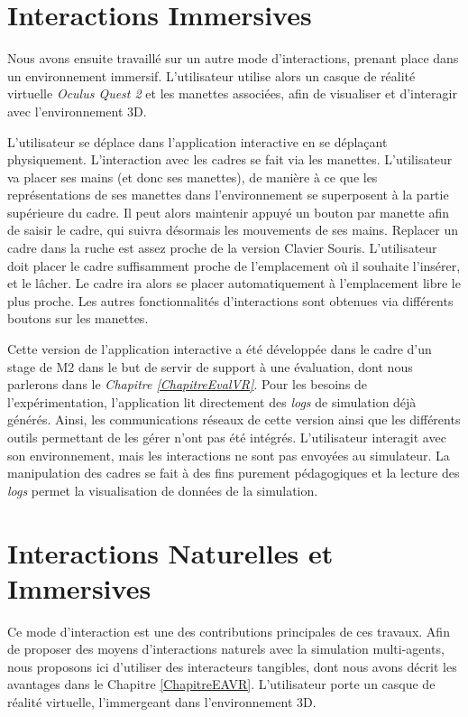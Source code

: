 		
		
	\section{Interactions Immersives}
	\label{immersionSansTangibles}
		Nous avons ensuite travaillé sur un autre mode d'interactions, prenant place dans un environnement immersif. L'utilisateur utilise alors un casque de réalité virtuelle \textit{Oculus Quest 2} et les manettes associées, afin de visualiser et d'interagir avec l'environnement 3D.
		
		 L'utilisateur se déplace dans l'application interactive en se déplaçant physiquement. L'interaction avec les cadres se fait via les manettes. L'utilisateur va placer ses mains (et donc ses manettes), de manière à ce que les représentations de ses manettes dans l'environnement se superposent à la partie supérieure du cadre. Il peut alors maintenir appuyé un bouton par manette afin de saisir le cadre, qui suivra désormais les mouvements de ses mains. Replacer un cadre dans la ruche est assez proche de la version Clavier Souris. L'utilisateur doit placer le cadre suffisamment proche de l'emplacement où il souhaite l'insérer, et le lâcher. Le cadre ira alors se placer automatiquement à l'emplacement libre le plus proche. Les autres fonctionnalités d'interactions sont obtenues via différents boutons sur les manettes.
		
		Cette version de l'application interactive a été développée dans le cadre d'un stage de M2 dans le but de servir de support à une évaluation, dont nous parlerons dans le \textit{Chapitre \ref{ChapitreEvalVR}}. Pour les besoins de l'expérimentation, l'application lit directement des \textit{logs} de simulation déjà générés. Ainsi, les communications réseaux de cette version ainsi que les différents outils permettant de les gérer n'ont pas été intégrés. L'utilisateur interagit avec son environnement, mais les interactions ne sont pas envoyées au simulateur. La manipulation des cadres se fait à des fins purement pédagogiques et la lecture des \textit{logs} permet la visualisation de données de la simulation. 
		
		
	\section{Interactions Naturelles et Immersives}
	\label{InterTangible}
	
	Ce mode d'interaction est une des contributions principales de ces travaux. Afin de proposer des moyens d'interactions naturels avec la simulation multi-agents, nous proposons ici d'utiliser des interacteurs tangibles, dont nous avons décrit les avantages dans le Chapitre \ref{ChapitreEAVR}. L'utilisateur porte un casque de réalité virtuelle, l'immergeant dans l'environnement 3D.

